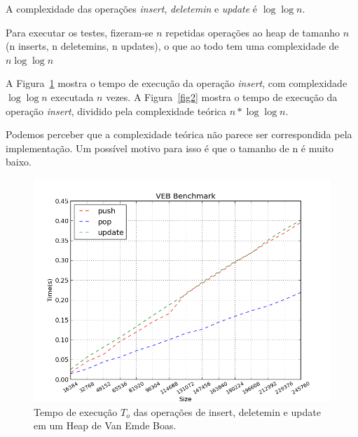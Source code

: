 \documentclass{article}
\begin{document}
A complexidade das operações \emph{insert}, \emph{deletemin} e \emph{update} é $ \log\log n $.

Para executar os testes, fizeram-se $ n $ repetidas operações ao heap de tamanho $ n $ (n inserts, n deletemins, n updates), o que ao todo tem uma complexidade de $ n \log\log n $

A Figura~\ref{fig1} mostra o tempo de execução da operação \emph{insert}, com complexidade $\log\log n$ executada $n$ vezes. A Figura~\ref{fig2} mostra o tempo de execução da operação \emph{insert}, dividido pela complexidade teórica $n * \log\log n$.

Podemos perceber que a complexidade teórica não parece ser correspondida pela implementação. Um possível motivo para isso é que o tamanho de n é muito baixo.

\begin{figure}
  \centering
  \includegraphics[width=\textwidth,keepaspectratio]{heap2.png}
  \caption{Tempo de execução $T_o$ das operações de insert, deletemin e update em um Heap de Van Emde Boas.}
  \label{fig1}
\end{figure}
\end{document}

